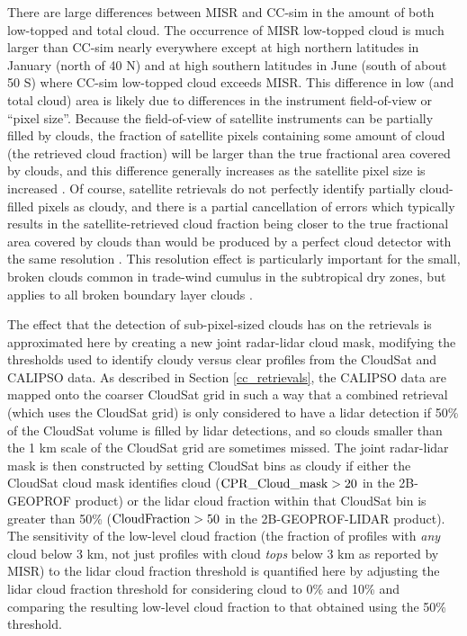 There are large differences between MISR and CC-sim in the amount of both low-topped and total cloud. The occurrence of MISR low-topped cloud is much larger than CC-sim nearly everywhere except at high northern latitudes in January (north of 40 N) and at high southern latitudes in June (south of about 50 S) where CC-sim low-topped cloud exceeds MISR. This difference in low (and total cloud) area is likely due to differences in the instrument field-of-view or ``pixel size''. Because the field-of-view of satellite instruments can be partially filled by clouds, the fraction of satellite pixels containing some amount of cloud (the retrieved cloud fraction) will be larger than the true fractional area covered by clouds, and this difference generally increases as the satellite pixel size is increased \citep{digirolamo_and_davies_1997}. Of course, satellite retrievals do not perfectly identify partially cloud-filled pixels as cloudy, and there is a partial cancellation of errors which typically results in the satellite-retrieved cloud fraction being closer to the true fractional area covered by clouds than would be produced by a perfect cloud detector with the same resolution \citep{wielicki_and_parker_1992}. This resolution effect is particularly important for the small, broken clouds common in trade-wind cumulus in the subtropical dry zones, but applies to all broken boundary layer clouds \citep{zhao_and_digirolamo_2006, marchand_et_al_2010}. 

The effect that the detection of sub-pixel-sized clouds has on the retrievals is approximated here by creating a new joint radar-lidar cloud mask, modifying the thresholds used to identify cloudy versus clear profiles from the CloudSat and CALIPSO data. As described in Section \ref{cc_retrievals}, the CALIPSO data are mapped onto the coarser CloudSat grid in such a way that a combined retrieval (which uses the CloudSat grid) is only considered to have a lidar detection if 50\% of the CloudSat volume is filled by lidar detections, and so clouds smaller than the 1 km scale of the CloudSat grid are sometimes missed. The joint radar-lidar mask is then constructed by setting CloudSat bins as cloudy if either the CloudSat cloud mask identifies cloud (${\rm CPR\_Cloud\_mask} > 20$ in the 2B-GEOPROF product) or the lidar cloud fraction within that CloudSat bin is greater than 50\% (${\rm CloudFraction} > 50$ in the 2B-GEOPROF-LIDAR product). The sensitivity of the low-level cloud fraction (the fraction of profiles with \emph{any} cloud below 3 km, not just profiles with cloud \emph{tops} below 3 km as reported by MISR) to the lidar cloud fraction threshold is quantified here by adjusting the lidar cloud fraction threshold for considering cloud to 0\% and 10\% and comparing the resulting low-level cloud fraction to that obtained using the 50\% threshold.

